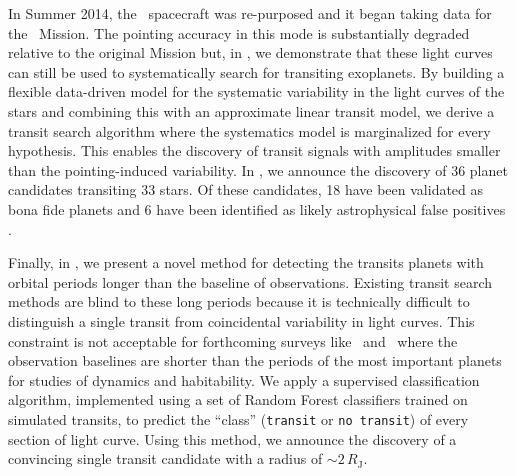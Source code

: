 In Summer 2014, the \kepler\ spacecraft was re-purposed and it began taking
data for the \KT\ Mission.
The pointing accuracy in this mode is substantially degraded relative to the
original Mission but, in , we demonstrate that these light curves
can still be used to systematically search for transiting exoplanets.
By building a flexible data-driven model for the systematic variability in the
light curves of the stars and combining this with an approximate linear
transit model, we derive a transit search algorithm where the systematics
model is marginalized for every hypothesis.
This enables the discovery of transit signals with amplitudes smaller than the
pointing-induced variability.
In , we announce the discovery of 36 planet candidates transiting
33 stars.
Of these candidates, 18 have been validated as bona fide planets and 6 have
been identified as likely astrophysical false positives
\citep{Crossfield:2015, Montet:2015, Armstrong:2015a}.

Finally, in , we present a novel method for detecting the
transits planets with orbital periods longer than the baseline of
observations.
Existing transit search methods are blind to these long periods because it is
technically difficult to distinguish a single transit from coincidental
variability in light curves.
This constraint is not acceptable for forthcoming surveys like \KT\ and \tess\
where the observation baselines are shorter than the periods of the most
important planets for studies of dynamics and habitability.
We apply a supervised classification algorithm, implemented using a set of
Random Forest classifiers trained on simulated transits, to predict the
``class'' (\texttt{transit} or \texttt{no transit}) of every section of light
curve.
Using this method, we announce the discovery of a convincing single transit
candidate with a radius of $\sim 2\,R_\mathrm{J}$.

